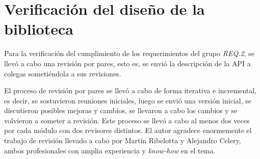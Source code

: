 \section{Verificación del diseño de la biblioteca}

Para la verificación del cumplimiento de los requerimientos del grupo \emph{REQ.2}, se llevó a cabo una revisión por pares, esto es, se envió la descripción de la API a colegas sometiéndola a sus revisiones. 

El proceso de revisión por pares se llevó a cabo de forma iterativa e incremental, es decir, se sostuvieron reuniones iniciales, luego se envió una versión inicial, se discutieron posibles mejoras y cambios, se llevaron a cabo los cambios y se volvieron a someter a revisión. Este proceso se llevó a cabo al menos dos veces por cada módulo con dos revisores distintos. El autor agradece enormemente el trabajo de revisión llevado a cabo por Martín Ribelotta y Alejandro Celery, ambos profesionales con amplia experiencia y \emph{know-how} en el tema.
